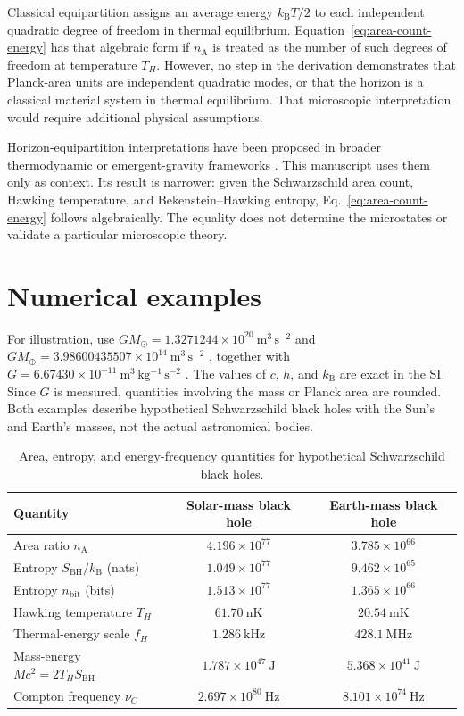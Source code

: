 \documentclass[12pt]{article}
\begin{document}
Classical equipartition assigns an average energy $k_{\mathrm B}T/2$ to each independent quadratic degree of freedom in thermal equilibrium. Equation~\eqref{eq:area-count-energy} has that algebraic form if $n_{\mathrm A}$ is treated as the number of such degrees of freedom at temperature $T_H$. However, no step in the derivation demonstrates that Planck-area units are independent quadratic modes, or that the horizon is a classical material system in thermal equilibrium. That microscopic interpretation would require additional physical assumptions.

Horizon-equipartition interpretations have been proposed in broader thermodynamic or emergent-gravity frameworks \cite{Padmanabhan,Verlinde}. This manuscript uses them only as context. Its result is narrower: given the Schwarzschild area count, Hawking temperature, and Bekenstein--Hawking entropy, Eq.~\eqref{eq:area-count-energy} follows algebraically. The equality does not determine the microstates or validate a particular microscopic theory.

\section{Numerical examples}

For illustration, use $GM_{\odot}=1.3271244\times10^{20}\ \mathrm{m^3\,s^{-2}}$ and $GM_{\oplus}=3.98600435507\times10^{14}\ \mathrm{m^3\,s^{-2}}$ \cite{JPL}, together with $G=6.67430\times10^{-11}\ \mathrm{m^3\,kg^{-1}\,s^{-2}}$ \cite{CODATA}. The values of $c$, $h$, and $k_{\mathrm B}$ are exact in the SI. Since $G$ is measured, quantities involving the mass or Planck area are rounded. Both examples describe hypothetical Schwarzschild black holes with the Sun's and Earth's masses, not the actual astronomical bodies.

\begin{table}[ht]
  \centering
  \caption{Area, entropy, and energy-frequency quantities for hypothetical Schwarzschild black holes.}
  \label{tab:counts}
  \begin{tabular}{lcc}
    \toprule
    Quantity & Solar-mass black hole & Earth-mass black hole \\
    \midrule
    Area ratio $n_{\mathrm A}$ & $4.196\times10^{77}$ & $3.785\times10^{66}$ \\
    Entropy $S_{\mathrm{BH}}/k_{\mathrm B}$ (nats) & $1.049\times10^{77}$ & $9.462\times10^{65}$ \\
    Entropy $n_{\mathrm{bit}}$ (bits) & $1.513\times10^{77}$ & $1.365\times10^{66}$ \\
    Hawking temperature $T_H$ & $61.70\ \mathrm{nK}$ & $20.54\ \mathrm{mK}$ \\
    Thermal-energy scale $f_H$ & $1.286\ \mathrm{kHz}$ & $428.1\ \mathrm{MHz}$ \\
    Mass-energy $Mc^2=2T_HS_{\mathrm{BH}}$ & $1.787\times10^{47}\ \mathrm{J}$ & $5.368\times10^{41}\ \mathrm{J}$ \\
    Compton frequency $\nu_C$ & $2.697\times10^{80}\ \mathrm{Hz}$ & $8.101\times10^{74}\ \mathrm{Hz}$ \\
    \bottomrule
  \end{tabular}
\end{table}
\end{document}
